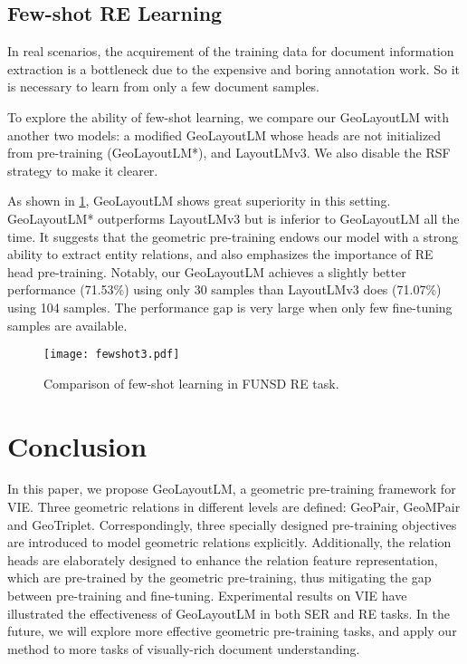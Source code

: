 \documentclass[10pt,twocolumn,letterpaper]{article}
\begin{document}
\subsection{Few-shot RE Learning}

In real scenarios, the acquirement of the training data for document information extraction is a bottleneck due to the expensive and boring annotation work. So it is necessary to learn from only a few document samples.

To explore the ability of few-shot learning, we compare our GeoLayoutLM with another two models: a modified GeoLayoutLM whose heads are not initialized from pre-training (GeoLayoutLM*), and LayoutLMv3. We also disable the RSF strategy to make it clearer.

As shown in \cref{fewshot}, GeoLayoutLM shows great superiority in this setting. GeoLayoutLM* outperforms LayoutLMv3 but is inferior to GeoLayoutLM all the time. It suggests that the geometric pre-training endows our model with a strong ability to extract entity relations, and also emphasizes the importance of RE head pre-training. Notably, our GeoLayoutLM achieves a slightly better performance (71.53\%) using only 30 samples than LayoutLMv3 does (71.07\%) using 104 samples. The performance gap is very large when only few fine-tuning samples are available.

\begin{figure}[t]
  \centering
   \texttt{[image: fewshot3.pdf]}
   \caption{Comparison of few-shot learning in FUNSD RE task.}
   \label{fewshot}
   \vspace{-3mm}
\end{figure}



\section{Conclusion}

In this paper, we propose GeoLayoutLM, a geometric pre-training framework for VIE.
Three geometric relations in different levels are defined: GeoPair, GeoMPair and GeoTriplet.
Correspondingly, three specially designed pre-training objectives are introduced to model geometric relations explicitly.
Additionally, the relation heads are elaborately designed to enhance the relation feature representation, which are pre-trained by the geometric pre-training, thus mitigating the gap between pre-training and fine-tuning.
Experimental results on VIE have illustrated the effectiveness of GeoLayoutLM in both SER and RE tasks.
In the future, we will explore more effective geometric pre-training tasks, and apply our method to more tasks of visually-rich document understanding.
\end{document}
